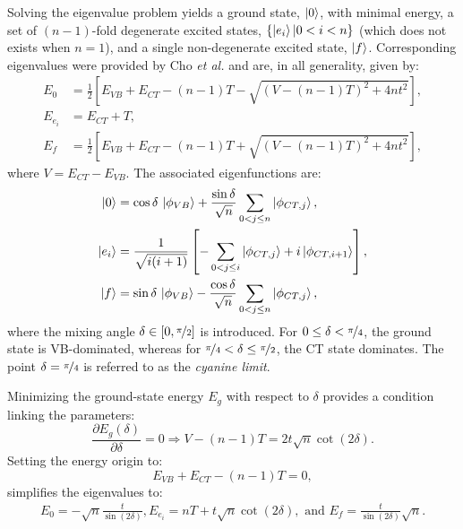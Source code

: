 \documentclass[12pt,a4paper]{article}
\begin{document}
Solving the eigenvalue problem yields a ground state, $\ket{0}$, with minimal energy, a set of $(n-1)$-fold degenerate excited states, $\{\ket{e_i} | 0<i< n\}$ (which does not exists when $n=1$), and a single non-degenerate excited state, $\ket{f}$.
Corresponding eigenvalues were provided by Cho \emph{et al.} \cite{choNonlinearOpticalProperties2002} and are, in all generality, given by:
\begin{align}
	E_{0} &= \frac{1}{2} \left[E_{VB} + E_{CT} - (n-1)T - \sqrt{(V - (n-1)T)^2 + 4nt^2}\right], \nonumber\\
	E_{e_i} &= E_{CT} + T, \nonumber\\
	E_{f} &= \frac{1}{2} \left[E_{VB} + E_{CT} - (n-1)T + \sqrt{(V - (n-1)T)^2 + 4nt^2}\right],
\end{align}
where $V = E_{CT} - E_{VB}$. 
The associated eigenfunctions are:
\begin{align}
	\ket{0} &= \cos\delta\,\ket{\phi_{VB}} + \frac{\sin\delta}{\sqrt{n}} \sum_{0<j\leq n} \ket{\phi_{CT,j}},\nonumber\\
	\ket{e_i} &= \frac{1}{\sqrt{i(i+1)}}\left[- \sum_{0<j\leq i} \ket{\phi_{CT,j}} +  i \ket{\phi_{CT,i+1}}\right],\nonumber\\
	\ket{f} &= \sin\delta\,\ket{\phi_{VB}} - \frac{\cos\delta}{\sqrt{n}} \sum_{0<j\leq n} \ket{\phi_{CT,j}},
\end{align}
where the mixing angle $\delta \in [0, \nicefrac{\pi}{2}]$ is introduced. For $0 \leq \delta < \nicefrac{\pi}{4}$, the ground state is VB-dominated, whereas for $\nicefrac{\pi}{4} < \delta \leq \nicefrac{\pi}{2}$, the CT state dominates. The point $\delta = \nicefrac{\pi}{4}$ is referred to as the \textit{cyanine limit}.

Minimizing the ground-state energy $E_g$ with respect to $\delta$ provides a condition linking the parameters:
\begin{equation}
	\frac{\partial E_g(\delta)}{\partial \delta} = 0 \Rightarrow V - (n-1)T = 2t \sqrt{n} \cot(2\delta). \label{eq:cot}
\end{equation}
Setting the energy origin to:
\begin{equation}
	E_{VB} + E_{CT} - (n-1)T = 0, \label{eq:eorig}
\end{equation}
simplifies the eigenvalues to:
\begin{align}
	E_{0} = -\sqrt{n} \frac{t}{\sin(2\delta)}, E_{e_i} = nT + t \sqrt{n} \cot(2\delta), \text{ and }
	E_{f} =  \frac{t}{\sin(2\delta)}\sqrt{n}.\label{eq:energies}
\end{align}
\end{document}
